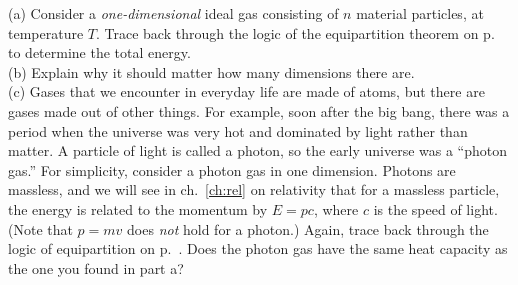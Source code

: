 (a) Consider a \emph{one-dimensional} ideal gas consisting of $n$ material particles, at temperature
$T$. Trace back through the logic of the equipartition theorem
on p.~\pageref{equipartition} to determine the total energy.\\
(b) Explain why it should matter how many dimensions there are.\\
(c) Gases that we encounter in everyday life are made of atoms, but there are
gases made out of other things. For example, soon after the big bang, there
was a period when the universe was very hot and dominated by light rather
than matter. A particle of light is called a photon, so the early universe
was a ``photon gas.'' For simplicity, consider a photon gas in one dimension.
Photons are massless, and we will see in ch.~\ref{ch:rel} on relativity that
for a massless particle, the energy is related to the momentum by $E=pc$,
where $c$ is the speed of light. (Note that $p=mv$ does \emph{not} hold for
a photon.) Again, trace back through the logic of equipartition
on p.~\pageref{equipartition}. Does the photon gas have the same heat capacity
as the one you found in part a?
